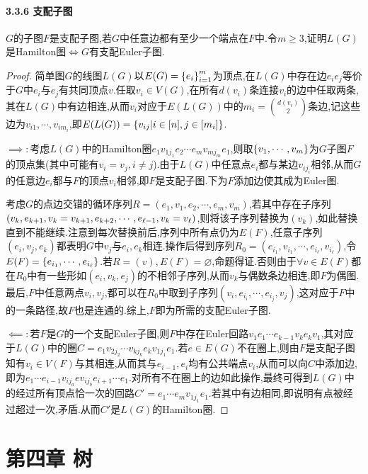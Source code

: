 \documentclass[11pt]{article}
\begin{document}
\paragraph{3.3.6 支配子图}$G$的子图$F$是支配子图,若$G$中任意边都有至少一个端点在$F$中.令$m\geq 3$,证明$L(G)$是Hamilton图$\iff G$有支配Euler子图.
\begin{proof}
简单图$G$的线图$L(G)$以$E(G)=\left\{e_i\right\}_{i=1}^m$为顶点,在$L(G)$中存在边$e_ie_j$等价于$G$中$e_i$与$e_j$有共同顶点$v$.任取$v_i\in V(G)$,在所有$d(v_i)$条连接$v_i$的边中任取两条,其在$L(G)$中有边相连,从而$v_i$对应于$E(L(G))$中的$m_i=\binom{d(v_i)}{2}$条边,记这些边为$v_{i1},\cdots, v_{im_i}$,即$E(L(G))=\left\{v_{ij}|i\in [n], j\in [m_i]\right\}$.

$\implies:$考虑$L(G)$中的Hamilton圈$e_1 v_{1j_1} e_2 \cdots e_m v_{mj_m} e_1$,则取$\left\{v_1,\cdots,v_m\right\}$为$G$子图$F$的顶点集(其中可能有$v_i=v_j, i\neq j$).由于$L(G)$中任意点$e_i$都与某边$v_{ij_i}$相邻,从而$G$的任意边$e_i$都与$F$的顶点$v_i$相邻,即$F$是支配子图.下为$F$添加边使其成为Euler图.

考虑$G$的点边交错的循环序列$R=(e_1, v_1, e_2, \cdots, e_m, v_m)$,若其中存在子序列$(v_k, e_{k+1}, v_k=v_{k+1}, e_{k+2}, \cdots,\linebreak e_{\ell-1}, v_k=v_\ell)$,则将该子序列替换为$(v_k)$,如此替换直到不能继续.注意到每次替换前后,序列中所有点仍为$E(F)$,任意子序列$(e_i,v_j,e_k)$都表明$G$中$v_j$与$e_i,e_k$相连.操作后得到序列$R_0=(e_{i_1}, v_{i_1}, \cdots, e_{i_\ell}, v_{i_\ell})$,令$E(F)=\left\{e_{i_1},\cdots,e_{i_\ell}\right\}$.若$R=(v),E(F)=\varnothing$,命题得证.否则由于$\forall v\in E(F)$都在$R_0$中有一些形如$(e_i, v_k, e_j)$的不相邻子序列,从而$v_k$与偶数条边相连,即$F$为偶图.最后,$F$中任意两点$v_i,v_j$,都可以在$R_0$中取到子序列$(v_i, e_{i_i}, \cdots, e_{i_j}, v_j)$,这对应于$F$中的一条路径,故$F$也是连通的.综上,$F$即为所需的支配Euler子图.

$\impliedby:$若$F$是$G$的一个支配Euler子图,则$F$中存在Euler回路$v_1 e_1\cdots e_{k-1} v_k e_k v_1$,其对应于$L(G)$中的圈$C=e_1 v_{2j_2}\cdots v_{kj_k} e_k v_{1j_1} e_1$.若$e\in E(G)$不在圈上,则由$F$是支配子图知有$v_i\in V(F)$与其相连,从而其与$e_{i-1},e_i$均有公共端点$v_i$,从而可以向$C$中添加边,即为$e_1 \cdots e_{i-1} v_{ij_a} e v_{ij_b} e_{i+1} \cdots e_1$.对所有不在圈上的边如此操作,最终可得到$L(G)$中的经过所有顶点恰一次的回路$C'=e_1 \cdots e_m v_{1j_1} e_1$.若其中有边相同,即说明有点被经过超过一次,矛盾.从而$C'$是$L(G)$的Hamilton圈.
\end{proof}

\section{第四章\; 树}
\end{document}
